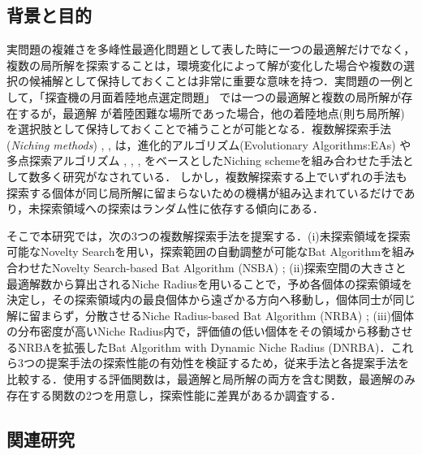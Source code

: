 \documentclass[a4j,11pt]{jarticle}
\begin{document}
\subsection{背景と目的}
実問題の複雑さを多峰性最適化問題として表した時に一つの最適解だけでなく，複数の局所解を探索することは，環境変化によって解が変化した場合や複数の選択の候補解として保持しておくことは非常に重要な意味を持つ．実問題の一例として，「探査機の月面着陸地点選定問題」\cite{ECCompetition} では一つの最適解と複数の局所解が存在するが，最適解
が着陸困難な場所であった場合，他の着陸地点(則ち局所解)を選択肢として保持しておくことで補うことが可能となる．複数解探索手法({\it Niching methods}) \cite{dADE}, \cite{nea}, \cite{CDE} は，進化的アルゴリズム(Evolutionary Algorithms:EAs) \cite{GA} や多点探索アルゴリズム \cite{CMA-ES}, \cite{PSO}, \cite{DE}, \cite{BA} をベースとしたNiching schemeを組み合わせた手法として数多く研究がなされている．
しかし，複数解探索する上でいずれの手法も探索する個体が同じ局所解に留まらないための機構が組み込まれているだけであり，未探索領域への探索はランダム性に依存する傾向にある．

そこで本研究では，次の3つの複数解探索手法を提案する．(i)未探索領域を探索可能なNovelty Searchを用い，探索範囲の自動調整が可能なBat Algorithmを組み合わせたNovelty Search-based Bat Algorithm (NSBA) \cite{NSBA}; (ii)探索空間の大きさと最適解数から算出されるNiche Radiusを用いることで，予め各個体の探索領域を決定し，その探索領域内の最良個体から遠ざかる方向へ移動し，個体同士が同じ解に留まらず，分散させるNiche Radius-based Bat Algorithm (NRBA) \cite{NRBA}; (iii)個体の分布密度が高いNiche Radius内で，評価値の低い個体をその領域から移動させるNRBAを拡張したBat Algorithm with Dynamic Niche Radius (DNRBA)．これら3つの提案手法の探索性能の有効性を検証するため，従来手法と各提案手法を比較する．使用する評価関数は，最適解と局所解の両方を含む関数，最適解のみ存在する関数の2つを用意し，探索性能に差異があるか調査する．


\subsection{関連研究}
\end{document}
